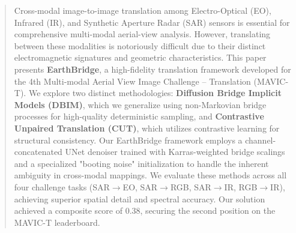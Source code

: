 \begin{abstract}
Cross-modal image-to-image translation among Electro-Optical (EO), Infrared (IR), and Synthetic Aperture Radar (SAR) sensors is essential for comprehensive multi-modal aerial-view analysis. However, translating between these modalities is notoriously difficult due to their distinct electromagnetic signatures and geometric characteristics. This paper presents \textbf{EarthBridge}, a high-fidelity translation framework developed for the 4th Multi-modal Aerial View Image Challenge -- Translation (MAVIC-T). We explore two distinct methodologies: \textbf{Diffusion Bridge Implicit Models (DBIM)}, which we generalize using non-Markovian bridge processes for high-quality deterministic sampling, and \textbf{Contrastive Unpaired Translation (CUT)}, which utilizes contrastive learning for structural consistency. Our EarthBridge framework employs a channel-concatenated UNet denoiser trained with Karras-weighted bridge scalings and a specialized "booting noise" initialization to handle the inherent ambiguity in cross-modal mappings. We evaluate these methods across all four challenge tasks (SAR$\rightarrow$EO, SAR$\rightarrow$RGB, SAR$\rightarrow$IR, RGB$\rightarrow$IR), achieving superior spatial detail and spectral accuracy. Our solution achieved a composite score of 0.38, securing the second position on the MAVIC-T leaderboard.
\end{abstract}
